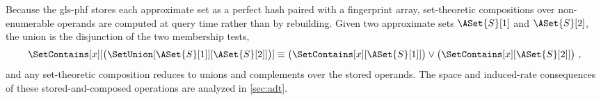 \documentclass[ ../main.tex]{subfiles}
\begin{document}
Because the \gls{gls-phf} stores each approximate set as a perfect hash paired
with a fingerprint array, set-theoretic compositions over non-enumerable
operands are computed at query time rather than by rebuilding. Given two
approximate sets $\ASet{S}[1]$ and $\ASet{S}[2]$, the union is the disjunction of
the two membership tests,
\begin{equation}
\SetContains[x][\left(\SetUnion[\ASet{S}[1]][\ASet{S}[2]]\right)] \equiv \left(\SetContains[x][\ASet{S}[1]]\right) \lor \left(\SetContains[x][\ASet{S}[2]]\right)\,,
\end{equation}
and any set-theoretic composition reduces to unions and complements over the
stored operands. The space and induced-rate consequences of these
stored-and-composed operations are analyzed in \cref{sec:adt}.
\end{document}
